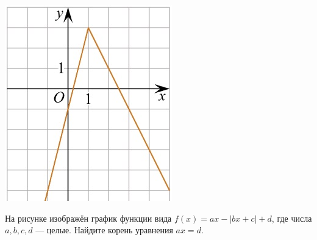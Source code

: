 \begin{class}[number=6]
\begin{listofex}
\begin{minipage}[c]{0.23\textwidth}
			\includegraphics[align=t, width=\textwidth]{pics/G101M4C6-8.jpg}
		\end{minipage}
		\item
		\begin{minipage}[t]{0.79\textwidth}
			На рисунке изображён график функции вида \(f(x)=ax-|bx+c|+d\), где числа \(a, b, c, d\) --- целые. Найдите корень уравнения \(ax=d\).
		\end{minipage}
		\begin{minipage}[c]{0.17\textwidth}

\end{minipage}
\end{listofex}
\end{class}

